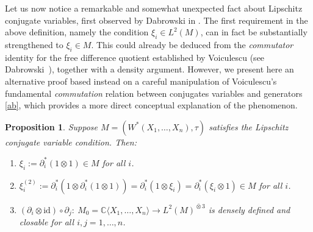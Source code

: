 \documentclass[10pt,a4paper,reqno]{amsart}
\newtheorem{proposition}[theorem]{Proposition}
\newcommand{\A}{\mathbb{C}\langle X_1,\dots,X_n\rangle}
\begin{document}
\begin{flushleft}
   Let us now notice a remarkable and somewhat unexpected fact about Lipschitz conjugate variables, first observed by Dabrowski in \cite[Sketch of Proof of
Corollary~25~(a')]{Dab14}.  
The first requirement in the above definition, namely the condition
$\xi_i \in L^2(M)$, can in fact be substantially strengthened to $\xi_i \in M$. 
This could already be deduced from the \emph{commutator} identity for the free
difference quotient established by Voiculescu (see Dabrowski~\cite[Equality~(1)]{Dab10}), together
with a density argument.  
However, we present here an alternative proof based instead on a careful
manipulation of Voiculescu’s fundamental \emph{commutation} relation between conjugates variables and generators
\eqref{ab}, which provides a more direct conceptual explanation of the phenomenon.

\end{flushleft}
\begin{proposition}\label{prop5}
Suppose $M=(W^\ast(X_1,\ldots,X_n),\tau)$ satisfies the \emph{Lipschitz conjugate variable condition}. Then:
\begin{enumerate}
  \item $\xi_i:=\partial_i^\ast(1\otimes 1)\in M$ for all $i$.
  \item $\xi_i^{(2)}:=\partial_i^\ast(1\otimes \partial_i^\ast(1\otimes 1))=\partial_i^\ast( 1\otimes \xi_i)=\partial_i^\ast(\xi_i\otimes 1)\in M$ for all $i$.
  \item $(\partial_i\otimes \mathrm{id})\circ \partial_j:\ M_0=\A\to L^2(M)^{\bar\otimes 3}$ is densely defined and closable for all $i,j=1,\ldots,n$.
\end{enumerate}
\end{proposition}
\end{document}
